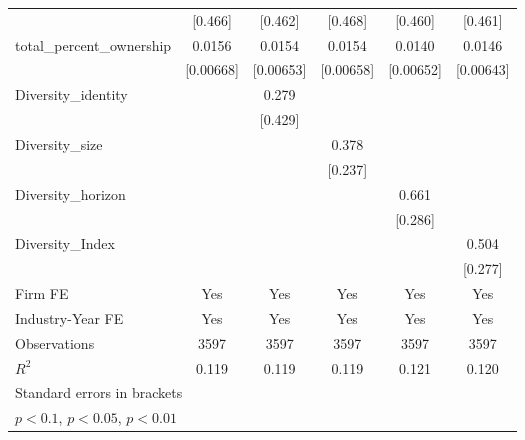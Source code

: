 {\begin{tabular}{l*{5}{c}}
            &     [0.466]         &     [0.462]         &     [0.468]         &     [0.460]         &     [0.461]         \\
[1em]
total\_percent\_ownership&      0.0156\sym{**} &      0.0154\sym{**} &      0.0154\sym{**} &      0.0140\sym{**} &      0.0146\sym{**} \\
            &   [0.00668]         &   [0.00653]         &   [0.00658]         &   [0.00652]         &   [0.00643]         \\
[1em]
Diversity\_identity&                     &       0.279         &                     &                     &                     \\
            &                     &     [0.429]         &                     &                     &                     \\
[1em]
Diversity\_size&                     &                     &       0.378         &                     &                     \\
            &                     &                     &     [0.237]         &                     &                     \\
[1em]
Diversity\_horizon&                     &                     &                     &       0.661\sym{**} &                     \\
            &                     &                     &                     &     [0.286]         &                     \\
[1em]
Diversity\_Index&                     &                     &                     &                     &       0.504\sym{*}  \\
            &                     &                     &                     &                     &     [0.277]         \\
\hline
Firm FE     &         Yes         &         Yes         &         Yes         &         Yes         &         Yes         \\
Industry-Year FE&         Yes         &         Yes         &         Yes         &         Yes         &         Yes         \\
Observations&        3597         &        3597         &        3597         &        3597         &        3597         \\
$ R^2 $     &       0.119         &       0.119         &       0.119         &       0.121         &       0.120         \\
\hline\hline
\multicolumn{6}{l}{\footnotesize Standard errors in brackets}\\
\multicolumn{6}{l}{\footnotesize \sym{*} \(p<0.1\), \sym{**} \(p<0.05\), \sym{***} \(p<0.01\)}\\
\end{tabular}
}
